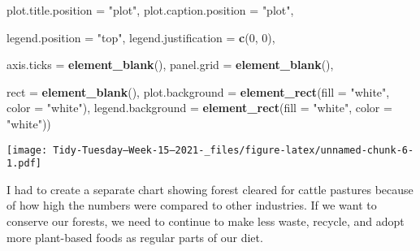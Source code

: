 \documentclass[
]{article}
\newenvironment{Shaded}{\begin{snugshade}}{\end{snugshade}}
\newcommand{\DataTypeTok}[1]{\textcolor[rgb]{0.13,0.29,0.53}{#1}}
\newcommand{\DecValTok}[1]{\textcolor[rgb]{0.00,0.00,0.81}{#1}}
\newcommand{\KeywordTok}[1]{\textcolor[rgb]{0.13,0.29,0.53}{\textbf{#1}}}
\newcommand{\NormalTok}[1]{#1}
\newcommand{\StringTok}[1]{\textcolor[rgb]{0.31,0.60,0.02}{#1}}
\begin{document}
\begin{Shaded}
\begin{Highlighting}[]
        \DataTypeTok{plot.title.position =} \StringTok{"plot"}\NormalTok{,}
        \DataTypeTok{plot.caption.position =} \StringTok{"plot"}\NormalTok{,}
  
        \DataTypeTok{legend.position =} \StringTok{"top"}\NormalTok{,}
        \DataTypeTok{legend.justification =} \KeywordTok{c}\NormalTok{(}\DecValTok{0}\NormalTok{, }\DecValTok{0}\NormalTok{),}
    
        \DataTypeTok{axis.ticks =} \KeywordTok{element\_blank}\NormalTok{(),}
        \DataTypeTok{panel.grid =} \KeywordTok{element\_blank}\NormalTok{(),}
    
        \DataTypeTok{rect =} \KeywordTok{element\_blank}\NormalTok{(),}
        \DataTypeTok{plot.background =} \KeywordTok{element\_rect}\NormalTok{(}\DataTypeTok{fill =} \StringTok{"white"}\NormalTok{, }\DataTypeTok{color =} \StringTok{"white"}\NormalTok{),}
        \DataTypeTok{legend.background =} \KeywordTok{element\_rect}\NormalTok{(}\DataTypeTok{fill =} \StringTok{"white"}\NormalTok{, }\DataTypeTok{color =} \StringTok{"white"}\NormalTok{))}
\end{Highlighting}
\end{Shaded}

\texttt{[image: Tidy-Tuesday---Week-15--2021-\_files/figure-latex/unnamed-chunk-6-1.pdf]}

I had to create a separate chart showing forest cleared for cattle
pastures because of how high the numbers were compared to other
industries. If we want to conserve our forests, we need to continue to
make less waste, recycle, and adopt more plant-based foods as regular
parts of our diet.
\end{document}

